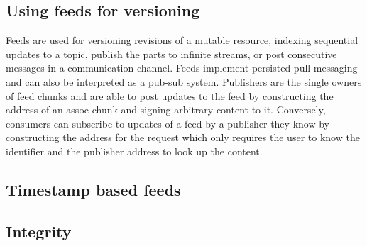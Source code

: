 \subsection{Using feeds for versioning}\label{sec:feed-as-channel}

Feeds are used for versioning revisions of a mutable resource, indexing sequential updates to a topic, publish the parts to infinite streams, or post consecutive messages in a communication channel. Feeds implement persisted pull-messaging and can also be interpreted as a pub-sub system. Publishers are the single owners of feed chunks and are able to post updates to the feed by constructing the address of an assoc chunk and signing arbitrary content to it. Conversely, consumers can subscribe to updates of a feed by a publisher they know by constructing the address for the request which only requires the user to know the identifier and the publisher address to look up the content. 

\subsection{Timestamp based feeds}\label{sec:time-based-feeds}

\subsection{Integrity}\label{sec:feed-integrity}

